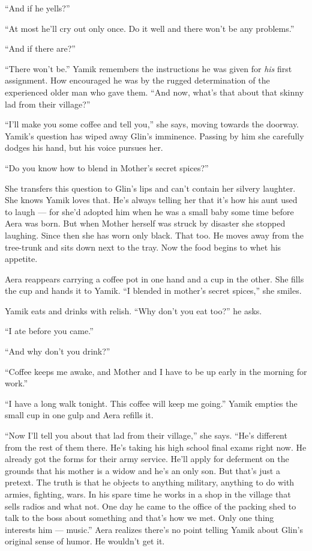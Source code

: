 \documentclass[twoside,11pt,openany]{book}
\begin{document}
``And if he yells?''

``At most he'll cry out only once. Do it well and there won't be any problems.''

``And if there are?''

``There won't be.'' Yamik remembers the instructions he was given for \textit{his} first assignment.
How encouraged he was by the rugged determination of the experienced older man who gave them. ``And now, what's that
about that skinny lad from their village?''

``I'll make you some coffee and tell you,'' she says, moving towards the doorway. Yamik's question has wiped away
Glin's {imminence}. Passing by him she carefully dodges his hand, but his voice pursues her.

``Do you know how to blend in Mother's secret spices?''

She transfers this question to Glin's lips and can't contain her silvery laughter. She knows Yamik loves that. He's
always telling her that it's how his aunt used to laugh ---  for she'd adopted him when he was a small baby some
time before Aera was born. But when Mother herself was struck by disaster she stopped laughing. Since then she has
worn only black. That too. He moves away from the tree-trunk and sits down next to the tray. Now the food begins to
whet his appetite.

Aera reappears carrying a coffee pot in one hand and a cup in the other. She fills the cup and hands it to Yamik. ``I
blended in mother's secret spices,'' she smiles.

Yamik eats and drinks with relish. ``Why don't you eat too?'' he asks.

``I ate before you came.''

``And why don't you drink?''

``Coffee keeps me awake, and Mother and I have to be up early in the morning for work.''

``I have a long walk tonight. This coffee will keep me going.'' Yamik empties the small cup in one gulp and Aera
refills it.

``Now I'll tell you about that lad from their village,'' she says. {}``He's different from the rest of them there.
He's taking his high school final exams right now. He already got the forms for their army service. He'll apply for
deferment on the grounds that his mother is a widow and he's an only son. But that's just a pretext. The truth is that
he objects to anything military, anything to do with armies, fighting, wars. In his spare time he works in a shop in
the village that sells radios and what not. One day he came to the office of the packing shed to talk to the
boss about something and that's how we met. Only one thing interests him --- music.'' Aera realizes there's no point
telling Yamik about Glin's original{ }sense of humor. He wouldn't get it.
\end{document}
